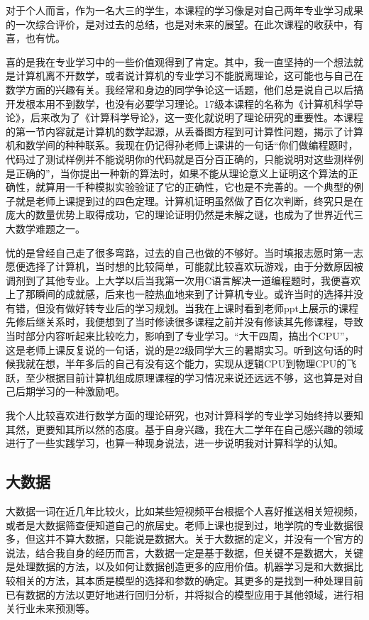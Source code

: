 \documentclass{article}
\begin{document}
对于个人而言，作为一名大三的学生，本课程的学习像是对自己两年专业学习成果的一次综合评价，是对过去的总结，也是对未来的展望。在此次课程的收获中，有喜，也有忧。\par
喜的是我在专业学习中的一些价值观得到了肯定。其中，我一直坚持的一个想法就是计算机离不开数学，或者说计算机的专业学习不能脱离理论，这可能也与自己在数学方面的兴趣有关。我经常和身边的同学争论这一话题，他们总是说自己以后搞开发根本用不到数学，也没有必要学习理论。17级本课程的名称为《计算机科学导论》，后来改为了《计算科学导论》，这一变化就说明了理论研究的重要性。本课程的第一节内容就是计算机的数学起源，从丢番图方程到可计算性问题，揭示了计算机和数学间的种种联系。我现在仍记得孙老师上课讲的一句话“你们做编程题时，代码过了测试样例并不能说明你的代码就是百分百正确的，只能说明对这些测样例是正确的”，当你提出一种新的算法时，如果不能从理论意义上证明这个算法的正确性，就算用一千种模拟实验验证了它的正确性，它也是不完善的。一个典型的例子就是老师上课提到过的四色定理。计算机证明虽然做了百亿次判断，终究只是在庞大的数量优势上取得成功，它的理论证明仍然是未解之谜，也成为了世界近代三大数学难题之一。
\par
忧的是曾经自己走了很多弯路，过去的自己也做的不够好。当时填报志愿时第一志愿便选择了计算机，当时想的比较简单，可能就比较喜欢玩游戏，由于分数原因被调剂到了其他专业。上大学以后当我第一次用C语言解决一道编程题时，我便喜欢上了那瞬间的成就感，后来也一腔热血地来到了计算机专业。或许当时的选择并没有错，但没有做好转专业后的学习规划。当我在上课时看到老师ppt上展示的课程先修后继关系时，我便想到了当时修读很多课程之前并没有修读其先修课程，导致当时部分内容听起来比较吃力，影响到了专业学习。“大干四周，搞出个CPU”，这是老师上课反复说的一句话，说的是22级同学大三的暑期实习。听到这句话的时候我就在想，半年多后的自己有没有这个能力，实现从逻辑CPU到物理CPU的飞跃，至少根据目前计算机组成原理课程的学习情况来说还远远不够，这也算是对自己后期学习的一种激励吧。\par
  我个人比较喜欢进行数学方面的理论研究，也对计算科学的专业学习始终持以要知其然，更要知其所以然的态度。基于自身兴趣，我在大二学年在自己感兴趣的领域进行了一些实践学习，也算一种现身说法，进一步说明我对计算科学的认知。




\subsection{大数据}
大数据一词在近几年比较火，比如某些短视频平台根据个人喜好推送相关短视频，或者是大数据筛查便知道自己的旅居史。老师上课也提到过，地学院的专业数据很多，但这并不算大数据，只能说是数据大。关于大数据的定义，并没有一个官方的说法，结合我自身的经历而言，大数据一定是基于数据，但关键不是数据大，关键是处理数据的方法，以及如何让数据创造更多的应用价值。机器学习是和大数据比较相关的方法，其本质是模型的选择和参数的确定。其更多的是找到一种处理目前已有数据的方法以更好地进行回归分析，并将拟合的模型应用于其他领域，进行相关行业未来预测等。
\end{document}
